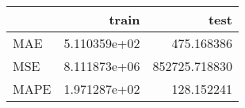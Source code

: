 \begin{tabular}{lrr}
\toprule
{} &         train &           test \\
\midrule
MAE  &  5.110359e+02 &     475.168386 \\
MSE  &  8.111873e+06 &  852725.718830 \\
MAPE &  1.971287e+02 &     128.152241 \\
\bottomrule
\end{tabular}

